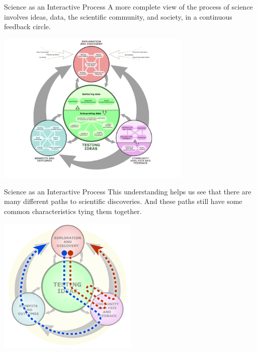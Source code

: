 \begin{frame}{Science as an Interactive Process}{}
  A more complete view of the process of science involves ideas, data, the scientific community, and society, in a continuous feedback circle.
  \begin{center}
    \includegraphics[width=0.7\textwidth]{../img/understandingscience_realprocess1}
  \end{center}
\end{frame}

\begin{frame}{Science as an Interactive Process}{}
  This understanding helps us see that there are many different paths to scientific discoveries. And these paths still have some common characteristics tying them together.
  \begin{center}
    \includegraphics[width=0.5\textwidth]{../img/understandingscience_realprocess2}
  \end{center}
\end{frame}


